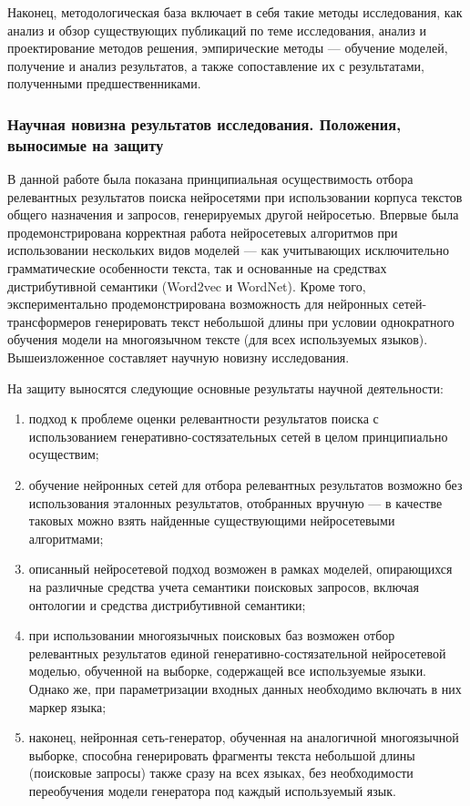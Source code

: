 Наконец, методологическая база включает в себя такие методы исследования, как анализ и обзор существующих публикаций
по теме исследования, анализ и проектирование методов решения, эмпирические методы --- обучение моделей, получение
и анализ результатов, а также сопоставление их с результатами, полученными предшественниками.

\subsubsection{Научная новизна результатов исследования. Положения, выносимые на защиту}
В данной работе была показана принципиальная осуществимость отбора релевантных результатов поиска нейросетями при использовании
корпуса текстов общего назначения и запросов, генерируемых другой нейросетью. Впервые была продемонстрирована корректная
работа нейросетевых алгоритмов при использовании нескольких видов моделей --- как учитывающих исключительно грамматические
особенности текста, так и основанные на средствах дистрибутивной семантики (Word2vec и WordNet). Кроме того, экспериментально
продемонстрирована возможность для нейронных сетей-трансформеров генерировать текст небольшой длины при условии однократного
обучения модели на многоязычном тексте (для всех используемых языков).
Вышеизложенное составляет научную новизну исследования.

На защиту выносятся следующие основные результаты научной деятельности:
\begin{enumerate}[1)]
      \item подход к проблеме оценки релевантности результатов поиска с использованием 
            генеративно-состязательных сетей в целом принципиально осуществим;
      \item обучение нейронных сетей для отбора релевантных результатов возможно без использования эталонных результатов,
            отобранных вручную --- в качестве таковых можно взять найденные существующими нейросетевыми алгоритмами;
      \item описанный нейросетевой подход возможен в рамках моделей, опирающихся на различные средства учета семантики
            поисковых запросов, включая онтологии и средства дистрибутивной семантики;
      \item при использовании многоязычных поисковых баз возможен отбор релевантных результатов единой генеративно-состязательной
            нейросетевой моделью, обученной на выборке, содержащей все используемые языки. Однако же, при параметризации входных
            данных необходимо включать в них маркер языка;
      \item наконец, нейронная сеть-генератор, обученная на аналогичной многоязычной выборке, способна генерировать фрагменты
            текста небольшой длины (поисковые запросы) также сразу на всех языках, без необходимости переобучения модели
            генератора под каждый используемый язык.
\end{enumerate}

